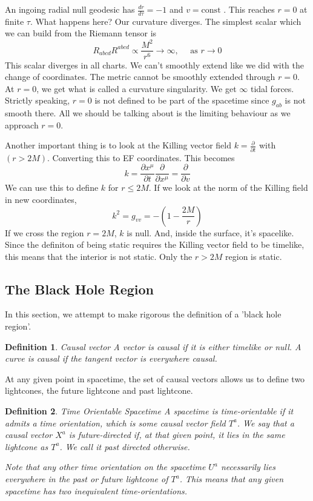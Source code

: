 \documentclass[11pt, oneside]{article}   	%
\theoremstyle{slanted}
\newtheorem*{defn}{Definition}
\begin{document}
An ingoing radial null geodesic 
has $ \frac{dr }{ d \tau }  = - 1 $ and $ v = \text{const } $. 
This reaches $ r = 0 $ at finite $ \tau $. 
What happens here? Our curvature diverges. 
The simplest scalar which 
we can build from the Riemann tensor is 
\[
R _{ abcd } R ^{ ab cd }  \propto \frac{ M ^ 2 }{ r ^ 6 } \to \infty, \quad \text{ as } 
r \to 0 
\]  This scalar diverges in all charts. 
We can't smoothly extend like we did with the change of coordinates. 
The metric cannot be smoothly extended through $ r = 0 $. 
At $ r = 0 $, 
we get what is called a curvature singularity. 
We get $ \infty$ tidal forces. 
Strictly speaking, $ r   = 0$ is not defined 
to be part of the spacetime since $ g _{ ab } $ is not smooth there. All we should be talking 
about is the limiting behaviour as we approach $ r = 0 $. 

Another important thing is to look at the 
Killing vector field $ k  =\frac{\partial  }{\partial  t }  $ with $ \left( r > 2M   \right)  $. Converting this to EF coordinates. 
This becomes 
\[
k = \frac{\partial  x ^ \mu }{\partial  t }  \frac{\partial  }{\partial  x ^ \mu }  
= \frac{\partial  }{\partial  v } 
\]  We can use this to define $ k $ for $ r \leq 2M $. 
If we look at the norm of the Killing field in new coordinates, 
\[
k ^ 2 = g _{ v v }  =  - \left( 1 - \frac{2M}{r }  \right)  
\] If we cross the region $ r  = 2M $, $ k $ is null. 
And, inside the surface, it's spacelike. 
Since the definiton of being static requires 
the Killing vector field to be timelike, 
this means that the interior is not static. 
Only the $ r > 2M $ region is static. 

\subsection{The Black Hole Region}
In this section, 
we attempt to make rigorous the 
definition of a 'black hole region'. 

\begin{defn}{Causal vector}
A vector is causal if 
it is either timelike or null. 
A curve is causal if
the tangent vector is everywhere causal. 
\end{defn}

At any given point in spacetime, 
the set of causal vectors allows 
us to define two lightcones, 
the future lightcone and past lightcone. 

\begin{defn}{Time Orientable Spacetime}
A spacetime is time-orientable 
if it 
admits a time orientation, which is 
some causal vector field $ T ^ a  $. 
We say that a causal vector $ X ^ a  $
is future-directed if, at that given 
point, it lies in the same lightcone as $ T ^ a $. 
We call it past directed otherwise. 

Note that any other 
time orientation on the spacetime $ U ^ a $
necessarily lies everywhere in the 
past or future lightcone of $ T ^ a $. 
This means that any given 
spacetime has two inequivalent time-orientations. 
\end{defn}
\end{document}
